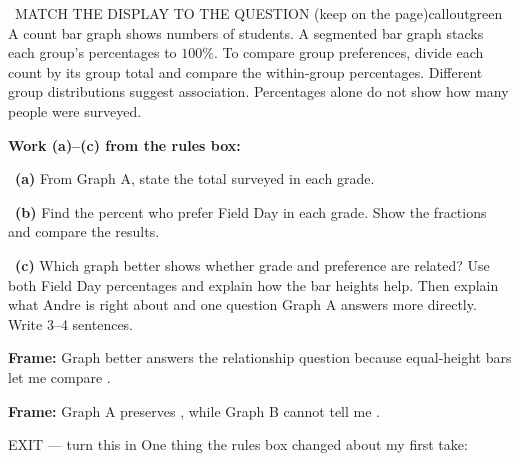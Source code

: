\documentclass[11pt]{article}
\begin{document}
\begin{callout}{\IconBook\ MATCH THE DISPLAY TO THE QUESTION (keep on the page)}{calloutgreen}
A count bar graph shows numbers of students. A segmented bar graph stacks each group's percentages to $100\%$. To compare group preferences, divide each count by its group total and compare the within-group percentages. Different group distributions suggest association. Percentages alone do not show how many people were surveyed.
\end{callout}

\newpage
\textbf{Work (a)--(c) from the rules box:}\par\smallskip

~\textbf{(a)} From Graph A, state the total surveyed in each grade.\par
\workspace{0.7in}

~\textbf{(b)} Find the percent who prefer Field Day in each grade. Show the fractions and compare the results.\par
\workspace{1.4in}

~\textbf{(c)} Which graph better shows whether grade and preference are related? Use both Field Day percentages and explain how the bar heights help. Then explain what Andre is right about and one question Graph A answers more directly. Write 3--4 sentences.\par
\workspace{2.0in}

\begin{sentenceframebox}\raggedright\textbf{Frame:} Graph \blank[0.4in] better answers the relationship question because equal-height bars let me compare \blank[2.2in].\end{sentenceframebox}

\begin{sentenceframebox}\raggedright\textbf{Frame:} Graph A preserves \blank[1.2in], while Graph B cannot tell me \blank[2.0in].\end{sentenceframebox}

\begin{summaryexitbox}{EXIT --- turn this in}
One thing the rules box changed about my first take: \hrulefill\par
\workspace{0.4in}
\end{summaryexitbox}
\end{document}
